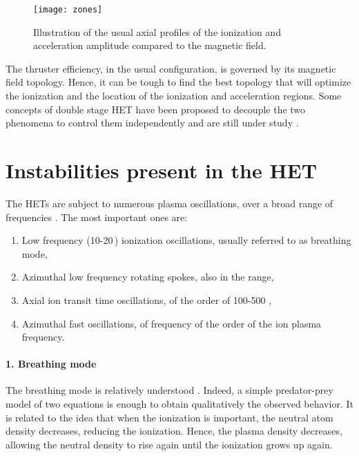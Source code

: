   \begin{figure}[hbt]
    \centering
    \texttt{[image: zones]}
    \caption{Illustration of the usual axial profiles of the ionization and acceleration amplitude compared to the magnetic field.}
    \label{fig-zones}
  \end{figure}

  The thruster efficiency, in the usual configuration, is governed by its magnetic field topology.
  Hence, it can be tough to find the best topology that will optimize the ionization and the location of the ionization and acceleration regions.
  Some concepts of double stage \ac{HET} have been proposed to decouple the two phenomena to control them independently and are still under study \citep{dubois2018}.
  

  
  \section*{Instabilities present in the \acs{HET} }
  \label{sec-physics}

  The \ac{HET}s are subject to numerous plasma oscillations, over a broad range of frequencies \citep{boeuf2017,choueiri2001}.
  The most important ones are\string:
  \begin{enumerate}
    \item Low frequency (10-20\,\kilo\hertz) ionization oscillations, usually referred to as breathing mode,
    \item Azimuthal low frequency rotating spokes, also in the \kilo\hertz{} range,
    \item Axial ion transit time oscillations, of the order of 100-500 \kilo\hertz,
    \item Azimuthal fast oscillations, of frequency of the order of the ion plasma frequency.
  \end{enumerate} 

  \paragraph{1. Breathing mode\\}
  The breathing mode is relatively understood \citep{boeuf1998,barral2009,hara2014}.
  Indeed, a simple predator-prey model of two equations is enough to obtain qualitatively the observed behavior.
  It is related to the idea that when the ionization is important, the neutral atom density decreases, reducing the ionization.
  Hence, the plasma density decreases, allowing the neutral density to rise again until the ionization grows up again.
  

